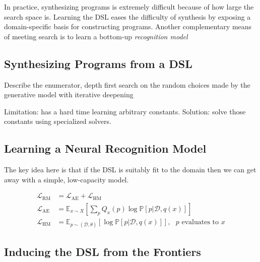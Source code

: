 \documentclass{article}
\newcommand{\expect}{\mathds{E}} %
\newcommand{\probability}{\mathds{P}} %
\begin{document}
In practice, synthesizing programs is extremely difficult because
of how large the search space is. Learning the DSL eases the difficulty of synthesis
by exposing a domain-specific basis for constructing programs.
Another complementary means of meeting search is to learn a
bottom-up \emph{recognition model}

\subsection{Synthesizing Programs from a DSL}\label{explorationSection}

Describe the enumerator, depth first search on the random choices made by the generative model with iterative deepening

Limitation: has a hard time learning arbitrary constants. Solution: solve those constants using specialized solvers.

\subsection{Learning a Neural Recognition Model}\label{recognitionSection}
The key idea here is that if the DSL is suitably fit to the domain then
we can get away with a simple, low-capacity model.

\begin{align}
  \mathcal{L}_{\text{RM}}& = \mathcal{L}_\text{AE} + \mathcal{L}_\text{HM}\\
  \mathcal{L}_{\text{AE}}& = \expect_{x\sim X}\left[\sum_p Q_x(p)\log \probability [p|\mathcal{D},q(x)]\right]\nonumber\\
    \mathcal{L}_{\text{HM}}& = \expect_{p\sim(\mathcal{D},\theta) }\left[\log \probability[p|\mathcal{D},q(x)]\right],\text{ $p$ evaluates to $x$}\nonumber
\end{align}

\subsection{Inducing the DSL from the Frontiers}\label{grammarInductionSection}
\end{document}
